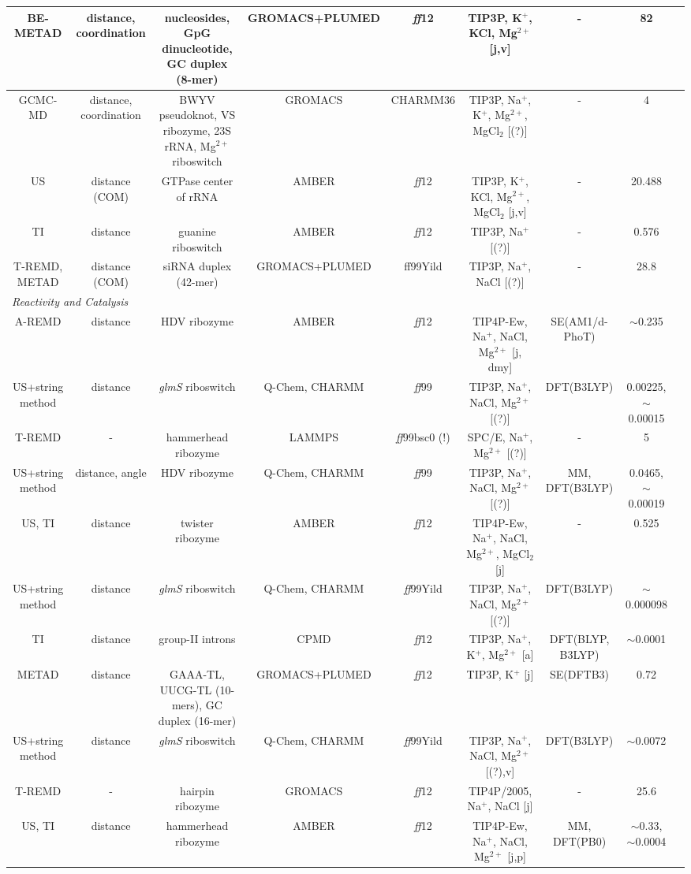 \begin{tabular}{ccccccccc}
\midrule 
BE-METAD & distance, coordination & nucleosides, GpG dinucleotide, GC duplex (8-mer) & GROMACS+PLUMED & \emph{ff}12 & TIP3P, K$^{+}$, KCl, Mg$^{2+}$ {[}j,v{]} & - & 82 & \cite{cunha2016ions}\tabularnewline
\midrule 
GCMC-MD & distance, coordination & BWYV pseudoknot, VS ribozyme, 23S rRNA, Mg$^{2+}$ riboswitch & GROMACS & CHARMM36 & TIP3P, Na$^{+}$, K$^{+}$, Mg$^{2+}$, MgCl$_{2}$ {[}(?){]} & - & 4 & \cite{lemkul2016characterization}\tabularnewline
\midrule 
US & distance (COM) & GTPase center of rRNA & AMBER & \emph{ff}12 & TIP3P, K$^{+}$, KCl, Mg$^{2+}$, MgCl$_{2}$ {[}j,v{]} & - & 20.488 & \cite{hayatshahi2017computational}\tabularnewline
\midrule 
TI & distance & guanine riboswitch & AMBER & \emph{ff}12 & TIP3P, Na$^{+}$ {[}(?){]} & - & 0.576 & \cite{hu2017ligand}\tabularnewline
\midrule 
T-REMD, METAD & distance (COM) & siRNA duplex (42-mer) & GROMACS+PLUMED & {ff}99Yild & TIP3P, Na$^{+}$, NaCl {[}(?){]} & - & 28.8 & \cite{grasso2017free}\tabularnewline
\midrule
\multicolumn{9}{l}{\emph{Reactivity and Catalysis}}\tabularnewline
\midrule 
A-REMD & distance & HDV ribozyme & AMBER & \emph{ff}12 & TIP4P-Ew, Na$^{+}$, NaCl, Mg$^{2+}$ {[}j, dmy{]} & SE(AM1/d-PhoT) & $\sim$0.235 & \cite{radak2015assessment}\tabularnewline
\midrule 
US+string method & distance & \emph{glmS} riboswitch & Q-Chem, CHARMM & \emph{ff}99 & TIP3P, Na$^{+}$, NaCl, Mg$^{2+}$ {[}(?){]} & DFT(B3LYP) & 0.00225, $\sim$0.00015 & \cite{zhang2015role}\tabularnewline
\midrule 
T-REMD & - & hammerhead ribozyme & LAMMPS & \emph{ff}99bsc0 (!) & SPC/E, Na$^{+}$, Mg$^{2+}$ {[}(?){]} & - & 5 & \cite{swadling2015structure}\tabularnewline
\midrule 
US+string method & distance, angle & HDV ribozyme & Q-Chem, CHARMM & \emph{ff}99 & TIP3P, Na$^{+}$, NaCl, Mg$^{2+}$ {[}(?){]} & MM, DFT(B3LYP) & 0.0465, $\sim$0.00019 & \cite{thaplyal2015inverse}\tabularnewline
\midrule 
US, TI & distance & twister ribozyme & AMBER & \emph{ff}12 & TIP4P-Ew, Na$^{+}$, NaCl, Mg$^{2+}$, MgCl$_{2}$ {[}j{]} & - & 0.525 & \cite{gaines2016ribozyme}\tabularnewline
\midrule 
US+string method & distance & \emph{glmS} riboswitch & Q-Chem, CHARMM & \emph{ff}99Yild  & TIP3P, Na$^{+}$, NaCl, Mg$^{2+}$ {[}(?){]} & DFT(B3LYP) & $\sim$0.000098 & \cite{zhang2016assessing}\tabularnewline
\midrule 
TI & distance & group-II introns & CPMD & \emph{ff}12 & TIP3P, Na$^{+}$, K$^{+}$, Mg$^{2+}$ {[}a{]} & DFT(BLYP, B3LYP) & $\sim$0.0001 & \cite{casalino2016activates}\tabularnewline
\midrule 
METAD & distance & GAAA-TL, UUCG-TL (10-mers), GC duplex (16-mer) & GROMACS+PLUMED & \emph{ff}12 & TIP3P, K$^{+}$ {[}j{]} & SE(DFTB3) & 0.72 & \cite{mlynsky2016inline}\tabularnewline
\midrule 
US+string method & distance & \emph{glmS} riboswitch & Q-Chem, CHARMM & \emph{ff}99Yild  & TIP3P, Na$^{+}$, NaCl, Mg$^{2+}$ {[}(?),v{]} & DFT(B3LYP) & $\sim$0.0072 & \cite{bingaman2017glcn6p}\tabularnewline
\midrule 
T-REMD & - & hairpin ribozyme & GROMACS & \emph{ff}12 & TIP4P/2005, Na$^{+}$, NaCl {[}j{]} & - & 25.6 & \cite{schuabb2017pressure}\tabularnewline
\midrule 
US, TI & distance & hammerhead ribozyme & AMBER & \emph{ff}12 & TIP4P-Ew, Na$^{+}$, NaCl, Mg$^{2+}$ {[}j,p{]} & MM, DFT(PB0) & $\sim$0.33, $\sim$0.0004 & \cite{chen2017divalent}\tabularnewline
\bottomrule
\end{tabular}

